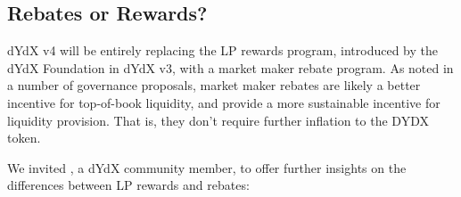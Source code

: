         \subsection{Rebates or Rewards?}

            dYdX v4 will be entirely replacing the LP rewards program, introduced by the dYdX Foundation in dYdX v3, with a market maker rebate program. As noted in a number of governance proposals, market maker rebates are likely a better incentive for top-of-book liquidity, and provide a more sustainable incentive for liquidity provision. That is, they don't require further inflation to the DYDX token.
            
            We invited , a dYdX community member, to offer further insights on the differences between LP rewards and rebates:

